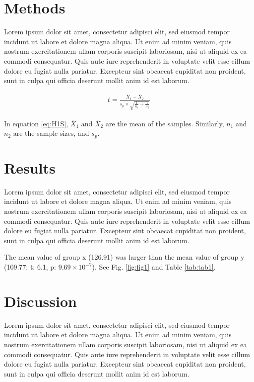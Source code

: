 \documentclass[
  12pt,
]{article}
\begin{document}
\hypertarget{methods}{%
\section{Methods}\label{methods}}

Lorem ipsum dolor sit amet, consectetur adipisci elit, sed eiusmod tempor incidunt ut labore et dolore magna aliqua. Ut enim ad minim veniam, quis nostrum exercitationem ullam corporis suscipit laboriosam, nisi ut aliquid ex ea commodi consequatur. Quis aute iure reprehenderit in voluptate velit esse cillum dolore eu fugiat nulla pariatur. Excepteur sint obcaecat cupiditat non proident, sunt in culpa qui officia deserunt mollit anim id est laborum.

\begin{align}
t = \frac{\bar{X}_{1} - \bar{X}_{2}} {s_{p} \times \sqrt{\frac{1}{n_{1}} + \frac{1}{n_{2}}}} \label{eq:H1S}
\end{align}

In equation \eqref{eq:H1S}, \(\bar{X}_{1}\) and \(\bar{X}_{2}\) are the mean of the samples. Similarly, \(n_{1}\) and \(n_{2}\) are the sample sizes, and \(s_{p}\).

\hypertarget{results}{%
\section{Results}\label{results}}

Lorem ipsum dolor sit amet, consectetur adipisci elit, sed eiusmod tempor incidunt ut labore et dolore magna aliqua. Ut enim ad minim veniam, quis nostrum exercitationem ullam corporis suscipit laboriosam, nisi ut aliquid ex ea commodi consequatur. Quis aute iure reprehenderit in voluptate velit esse cillum dolore eu fugiat nulla pariatur. Excepteur sint obcaecat cupiditat non proident, sunt in culpa qui officia deserunt mollit anim id est laborum.

The mean value of group x (126.91) was larger than the mean value of group y (109.77; t: 6.1, p: \ensuremath{9.69\times 10^{-7}}). See Fig. \ref{fig:fig1} and Table \ref{tab:tab1}.

\hypertarget{discussion}{%
\section{Discussion}\label{discussion}}

Lorem ipsum dolor sit amet, consectetur adipisci elit, sed eiusmod tempor incidunt ut labore et dolore magna aliqua. Ut enim ad minim veniam, quis nostrum exercitationem ullam corporis suscipit laboriosam, nisi ut aliquid ex ea commodi consequatur. Quis aute iure reprehenderit in voluptate velit esse cillum dolore eu fugiat nulla pariatur. Excepteur sint obcaecat cupiditat non proident, sunt in culpa qui officia deserunt mollit anim id est laborum.
\end{document}
